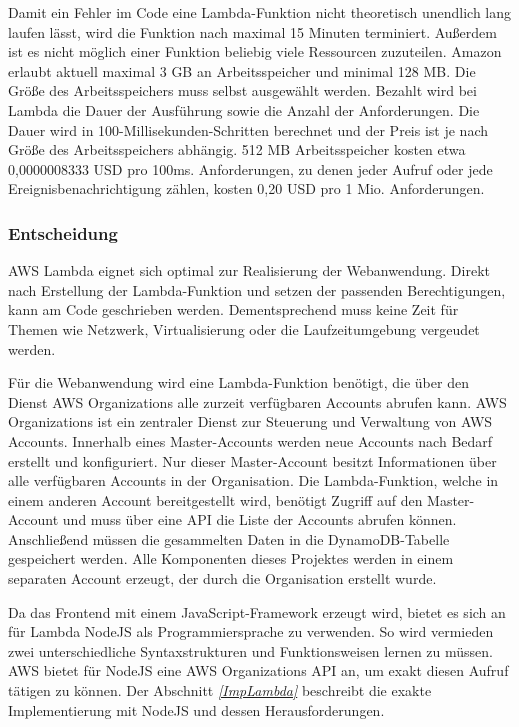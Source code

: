 {Damit ein Fehler im Code eine Lambda-Funktion nicht theoretisch unendlich lang laufen lässt, wird die Funktion nach maximal 15 Minuten terminiert.
Außerdem ist es nicht möglich einer Funktion beliebig viele Ressourcen zuzuteilen.
Amazon erlaubt aktuell maximal 3 GB an Arbeitsspeicher und minimal 128 MB.
Die Größe des Arbeitsspeichers muss selbst ausgewählt werden.
\clearpage
Bezahlt wird bei Lambda die Dauer der Ausführung sowie die Anzahl der Anforderungen.
Die Dauer wird in 100-Millisekunden-Schritten berechnet und der Preis ist je nach Größe des Arbeitsspeichers abhängig.
512 MB Arbeitsspeicher kosten etwa 0,0000008333 USD pro 100ms.
Anforderungen, zu denen jeder Aufruf oder jede Ereignisbenachrichtigung zählen, kosten 0,20 USD pro 1 Mio. Anforderungen.\cite{LambdaPreise}

\subsubsection{Entscheidung}
\label{LambdaEntscheidung}
AWS Lambda eignet sich optimal zur Realisierung der Webanwendung.
Direkt nach Erstellung der Lambda-Funktion und setzen der passenden Berechtigungen, kann am Code geschrieben werden.
Dementsprechend muss keine Zeit für Themen wie Netzwerk, Virtualisierung oder die Laufzeitumgebung vergeudet werden.

Für die Webanwendung wird eine Lambda-Funktion benötigt, die über den Dienst AWS Organizations alle zurzeit verfügbaren Accounts abrufen kann.
AWS Organizations ist ein zentraler Dienst zur Steuerung und Verwaltung von AWS Accounts.
Innerhalb eines Master-Accounts werden neue Accounts nach Bedarf erstellt und konfiguriert.
Nur dieser Master-Account besitzt Informationen über alle verfügbaren Accounts in der Organisation.
Die Lambda-Funktion, welche in einem anderen Account bereitgestellt wird, benötigt Zugriff auf den Master-Account und muss über eine API die Liste der Accounts abrufen können.
Anschließend müssen die gesammelten Daten in die DynamoDB-Tabelle gespeichert werden.
Alle Komponenten dieses Projektes werden in einem separaten Account erzeugt, der durch die Organisation erstellt wurde.

Da das Frontend mit einem JavaScript-Framework erzeugt wird, bietet es sich an für Lambda NodeJS als Programmiersprache zu verwenden.
So wird vermieden zwei unterschiedliche Syntaxstrukturen und Funktionsweisen lernen zu müssen.
AWS bietet für NodeJS eine AWS Organizations API an, um exakt diesen Aufruf tätigen zu können.
Der Abschnitt \textit{\ref{ImpLambda} } beschreibt die exakte Implementierung mit NodeJS und dessen Herausforderungen.

}
